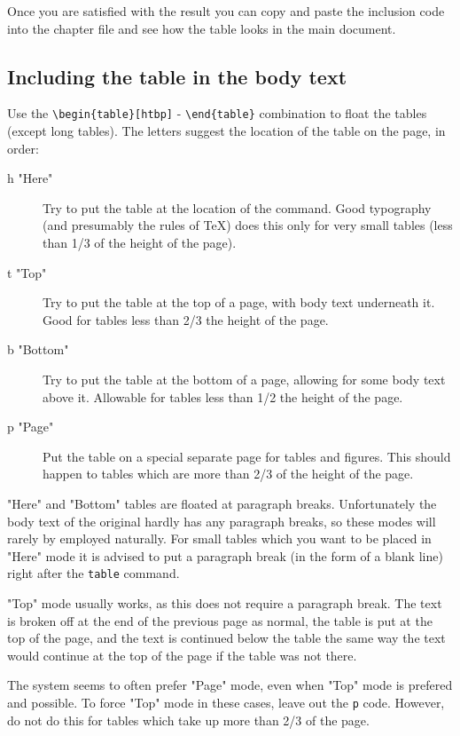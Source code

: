 \documentclass{report}
\begin{document}
Once you are satisfied with the result you can copy and paste the inclusion
code into the chapter file and see how the table looks in the main document.

\subsection{Including the table in the body text}
Use the \verb+\begin{table}[htbp]+ - \verb+\end{table}+ combination
to float the tables (except long tables).
The letters suggest the location of the table on the page, in order:
\begin{description}
\item[h "Here"] Try to put the table at the location of the command.
Good typography (and presumably the rules of \TeX{}) does this only for very
small tables (less than 1/3 of the height of the page).
\item[t "Top"] Try to put the table at the top of a page, with body text
underneath it.
Good for tables less than 2/3 the height of the page.
\item[b "Bottom"] Try to put the table at the bottom of a page, allowing for
some body text above it.
Allowable for tables less than 1/2 the height of the page.
\item[p "Page"] Put the table on a special separate page for tables and figures.
This should happen to tables which are more than 2/3 of the height of the page.
\end{description}
"Here" and "Bottom"
tables are floated at paragraph breaks.
Unfortunately the body text of the original
hardly has any paragraph breaks,
so these modes will rarely by employed naturally.
For small tables which you want to be placed in "Here" mode
it is advised to put a paragraph break (in the form of a blank line)
right after the \verb+table+ command.

"Top" mode usually works, as this does not require a paragraph break.
The text is broken off at the end of the previous page as normal,
the table is put at the top of the page, and the text is continued
below the table the same way the text would continue at the top of the
page if the table was not there.

The system seems to often prefer "Page" mode, even when "Top" mode is prefered
and possible. To force "Top" mode in these cases, leave out the \verb+p+ code.
However, do not do this for tables which take up more than 2/3 of the page.
\end{document}
